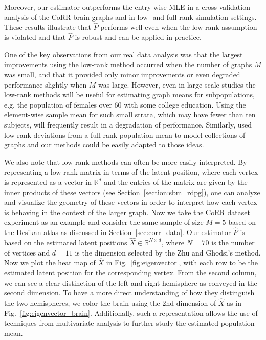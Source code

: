 \documentclass[10pt,letterpaper]{article}
\renewcommand{\Re}{\mathbb{R}}
\renewcommand{\hat}{\widehat}
\begin{document}
Moreover, our estimator outperforms the entry-wise MLE in a cross validation analysis of the CoRR brain graphs and in low- and full-rank simulation settings.
These results illustrate that $\hat{P}$ performs well even when the low-rank assumption is violated and that $\hat{P}$ is robust and can be applied in practice.

One of the key observations from our real data analysis was that the largest improvements using the low-rank method occurred when the number of graphs $M$ was small, and that it provided only minor improvements or even degraded performance slightly when $M$ was large. 
However, even in large scale studies the low-rank methods will be useful for estimating graph means for subpopulations, e.g. the population of females over 60 with some college education.
Using the element-wise sample mean for such small strata, which may have fewer than ten subjects, will frequently result in a degradation of performance.
Similarly, \citet{durante2014nonparametric} used low-rank deviations from a full rank population mean to model collections of graphs and our methods could be easily adapted to those ideas.

We also note that low-rank methods can often be more easily interpreted.
By representing a low-rank matrix in terms of the latent position, where each vertex is represented as a vector in $\Re^d$ and the entries of the matrix are given by the inner products of these vectors (see Section~\ref{section:sbm_rdpg}), one can analyze and visualize the geometry of these vectors in order to interpret how each vertex is behaving in the context of the larger graph. 
Now we take the CoRR dataset experiment as an example and consider the same sample of size $M=5$ based on the Desikan atlas as discussed in Section~\ref{sec:corr_data}. Our estimator $\hat{P}$ is based on the estimated latent positions $\hat{X} \in \mathbb{R}^{N\times d}$, where $N=70$ is the number of vertices and $d=11$ is the dimension selected by the Zhu and Ghodsi's method. Now we plot the heat map of $\hat{X}$ in Fig.~\ref{fig:eigenvector}, with each row to be the estimated latent position for the corresponding vertex. From the second column, we can see a clear distinction of the left and right hemisphere as conveyed in the second dimension. To have a more direct understanding of how they distinguish the two hemispheres, we color the brain using the 2nd dimension of $\hat{X}$ as in Fig.~\ref{fig:eigenvector_brain}. Additionally, such a representation allows the use of techniques from multivariate analysis to further study the estimated population mean.
\end{document}
